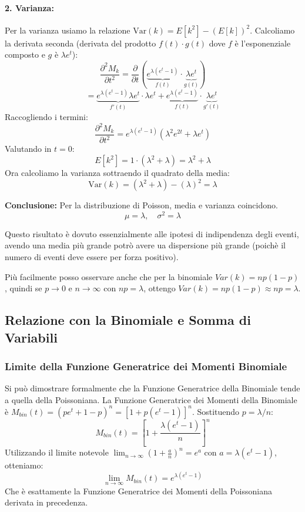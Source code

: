 \documentclass[openany,a4paper,12pt]{book}
\theoremstyle{remark}
\begin{document}
\paragraph{2. Varianza:}
Per la varianza usiamo la relazione $\text{Var}(k) = E[k^2] - (E[k])^2$.
Calcoliamo la derivata seconda (derivata del prodotto $f(t) \cdot g(t)$ dove $f$ è l'esponenziale composto e $g$ è $\lambda e^t$):
\[
\frac{\partial^2 M_k}{\partial t^2} = \frac{\partial}{\partial t} \left( \underbrace{e^{\lambda(e^t - 1)}}_{f(t)} \cdot \underbrace{\lambda e^t}_{g(t)} \right)
\]
\[
= \underbrace{e^{\lambda(e^t - 1)} \lambda e^t}_{f'(t)} \cdot \lambda e^t + \underbrace{e^{\lambda(e^t - 1)}}_{f(t)} \cdot \underbrace{\lambda e^t}_{g'(t)}
\]
Raccogliendo i termini:
\[
\frac{\partial^2 M_k}{\partial t^2} = e^{\lambda(e^t - 1)} (\lambda^2 e^{2t} + \lambda e^t)
\]
Valutando in $t=0$:
\[
E[k^2] = 1 \cdot (\lambda^2 + \lambda) = \lambda^2 + \lambda
\]
Ora calcoliamo la varianza sottraendo il quadrato della media:
\[
\text{Var}(k) = (\lambda^2 + \lambda) - (\lambda)^2 = \lambda
\]

\textbf{Conclusione:} Per la distribuzione di Poisson, media e varianza coincidono.
\begin{equation}
\boxed{\mu = \lambda, \quad \sigma^2 = \lambda}
\end{equation}

Questo risultato è dovuto essenzialmente alle ipotesi di indipendenza degli eventi, avendo una media più grande potrò avere ua dispersione più grande (poichè il numero di eventi deve essere per forza positivo).

Più facilmente posso osservare anche che per la binomiale $Var(k) = np(1-p)$, quindi se $p \to 0$ e $n \to \infty$ con $np = \lambda$, ottengo $Var(k) = np(1-p) \approx np = \lambda$.

\subsection*{Relazione con la Binomiale e Somma di Variabili}

\subsubsection{Limite della Funzione Generatrice dei Momenti Binomiale}
Si può dimostrare formalmente che la Funzione Generatrice della Binomiale tende a quella della Poissoniana.
La Funzione Generatrice dei Momenti della Binomiale è $M_{bin}(t) = (pe^t + 1 - p)^n = [1 + p(e^t - 1)]^n$.
Sostituendo $p = \lambda/n$:
\[
M_{bin}(t) = \left[ 1 + \frac{\lambda(e^t - 1)}{n} \right]^n
\]
Utilizzando il limite notevole $\lim_{n \to \infty} (1 + \frac{a}{n})^n = e^a$ con $a = \lambda(e^t - 1)$, otteniamo:
\[
\lim_{n \to \infty} M_{bin}(t) = e^{\lambda(e^t - 1)}
\]
Che è esattamente la Funzione Generatrice dei Momenti della Poissoniana derivata in precedenza.
\end{document}
